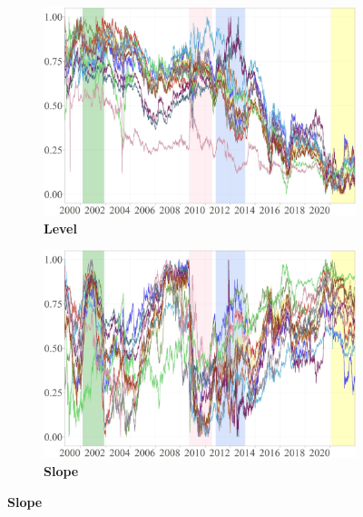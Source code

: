 \documentclass[12pt,bibliography=totoc]{article}
\begin{document}
\begin{figure}[H]

  \begin{subfigure}[t]{.5\textwidth}
    \centering
    \includegraphics[width=\linewidth]{Level}
    \caption{\textbf{Level}}
\label{fig:levelTimeSeries}
  \end{subfigure}
  \hfill
  \begin{subfigure}[t]{.5\textwidth}
    \centering
    \includegraphics[width=\linewidth]{Slope}
    \caption{\textbf{Slope}}
\label{fig:slopeTimeSeries}
  \end{subfigure}

  \medskip


\end{figure}
\end{document}
